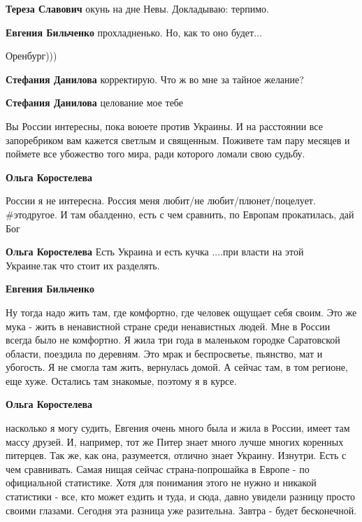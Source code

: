 \begin{itemize}
\begin{itemize}
\textbf{Тереза Славович} окунь на дне Невы. Докладываю: терпимо.

\textbf{Евгения Бильченко} прохладненько. Но, как то оно будет...
\end{itemize} %

Оренбург)))

\begin{itemize} %
\textbf{Стефания Данилова} корректирую. Что ж во мне за тайное желание?

\textbf{Стефания Данилова} целование мое тебе
\end{itemize} %


Вы России интересны, пока воюете против Украины. И на расстоянии все
запоребриком вам кажется светлым и священным. Поживете там пару месяцев и
поймете все убожество того мира, ради которого ломали свою судьбу.

\begin{itemize} %
\textbf{Ольга Коростелева} 

России я не интересна. Россия меня любит/не любит/плюнет/поцелует. \#этодругое.
И там обалденно, есть с чем сравнить, по Европам прокатилась, дай Бог

\textbf{Ольга Коростелева} Есть Украина и есть кучка ....при власти на этой Украине.так что стоит их разделять.

\textbf{Евгения Бильченко} 

Ну тогда надо жить там, где комфортно, где человек ощущает себя своим. Это же
мука - жить в ненавистной стране среди ненавистных людей. Мне в России всегда
было не комфортно. Я жила три года в маленьком городке Саратовской области,
поездила по деревням. Это мрак и беспросветье, пьянство, мат и убогость. Я не
смогла там жить, вернулась домой. А сейчас там, в том регионе, еще хуже.
Остались там знакомые, поэтому я в курсе.

\textbf{Ольга Коростелева} 

насколько я могу судить, Евгения очень много была и жила в России, имеет там
массу друзей. И, например, тот же Питер знает много лучше многих коренных
питерцев. Так же, как она, разумеется, отлично знает Украину. Изнутри. Есть с
чем сравнивать. Самая нищая сейчас страна-попрошайка в Европе - по официальной
статистике. Хотя для понимания этого не нужно и никакой статистики - все, кто
может ездить и туда, и сюда, давно увидели разницу просто своими глазами.
Сегодня эта разница уже разительна. Завтра - будет бесконечной.


\end{itemize}
\end{itemize}
